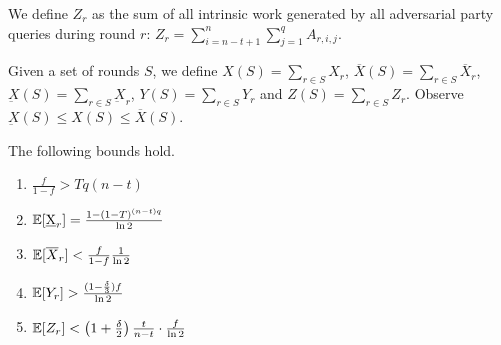 We define $Z_{r}$ as the sum of all intrinsic work generated by all adversarial
party queries during round $r$: $Z_{r} = \sum_{i = n - t + 1}^n \sum_{j = 1}^q A_{r, i, j}$.

Given a set of rounds $S$, we define
$X(S) = \sum_{r \in S} X_r$,
$\overline{X}(S) = \sum_{r \in S} \overline{X}_r$,
$\underbar{X}(S) = \sum_{r \in S} \underbar{X}_r$,
$Y(S) = \sum_{r \in S} Y_r$
and $Z(S) = \sum_{r \in S} Z_r$.
Observe $\underbar{X}(S) \leq X(S) \leq \overline{X}(S)$.

\begin{lemma}
  The following bounds hold.
  \begin{enumerate}
    \item $\frac{f}{1 - f} > Tq(n - t)$
    \item $\mathop{{}\mathbb{E}}[\underbar{X}_r] = \frac{1 - (1 - T)^{(n - t)q}}{\ln2}$
    \item $\mathop{{}\mathbb{E}}[\overline{X}_r] < \frac{f}{1 - f}\frac{1}{\ln2}$
    \item $\mathop{{}\mathbb{E}}[Y_r] > \frac{(1 - \frac{\delta}{3})f}{\ln2}$
    \item $\mathop{{}\mathbb{E}}[Z_r] < \left(1 + \frac{\delta}{2}\right)\frac{t}{n - t} \cdot \frac{f}{\ln2}$
  \end{enumerate}
\end{lemma}
